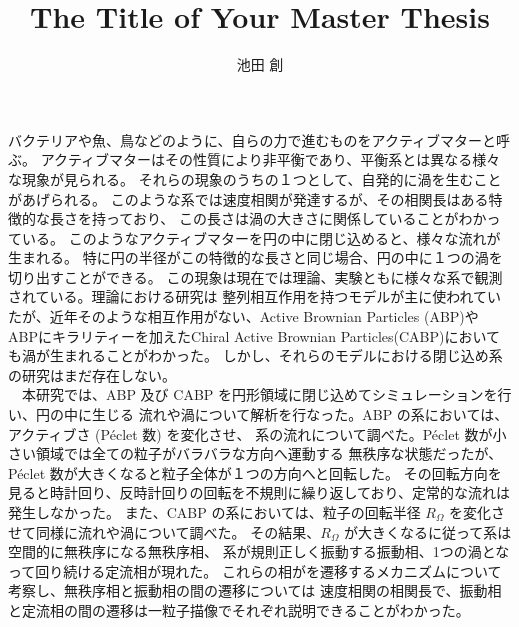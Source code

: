 \documentclass[a4paper]{jarticle}
\title{{\Large The Title of Your Master Thesis}}
\author{池田 創}
\date{}
\begin{document}
\maketitle
\thispagestyle{empty}
\normalsize
バクテリアや魚、鳥などのように、自らの力で進むものをアクティブマターと呼ぶ。
アクティブマターはその性質により非平衡であり、平衡系とは異なる様々な現象が見られる。
それらの現象のうちの１つとして、自発的に渦を生むことがあげられる。
このような系では速度相関が発達するが、その相関長はある特徴的な長さを持っており、
この長さは渦の大きさに関係していることがわかっている。
このようなアクティブマターを円の中に閉じ込めると、様々な流れが生まれる。
特に円の半径がこの特徴的な長さと同じ場合、円の中に１つの渦を切り出すことができる。
この現象は現在では理論、実験ともに様々な系で観測されている。理論における研究は
整列相互作用を持つモデルが主に使われていたが、近年そのような相互作用がない、Active Brownian Particles (ABP)や
ABPにキラリティーを加えたChiral Active Brownian Particles(CABP)においても渦が生まれることがわかった\cite{szamelLongrangedVelocityCorrelations2021,szamelLongrangedVelocityCorrelations2021,kurodaAnomalousFluctuationsHomogeneous2023,kurodaLongrangeTranslationalOrder2024}。
しかし、それらのモデルにおける閉じ込め系の研究はまだ存在しない。\\
　本研究では、ABP 及び CABP を円形領域に閉じ込めてシミュレーションを行い、円の中に生じる
流れや渦について解析を行なった。ABP の系においては、アクティブさ (Péclet 数) を変化させ、
系の流れについて調べた。Péclet 数が小さい領域では全ての粒子がバラバラな方向へ運動する
無秩序な状態だったが、Péclet 数が大きくなると粒子全体が１つの方向へと回転した。
その回転方向を見ると時計回り、反時計回りの回転を不規則に繰り返しており、定常的な流れは発生しなかった。
また、CABP の系においては、粒子の回転半径 $R_\Omega$ を変化させて同様に流れや渦について調べた。
その結果、$R_\Omega$ が大きくなるに従って系は空間的に無秩序になる無秩序相、
系が規則正しく振動する振動相、1つの渦となって回り続ける定流相が現れた。
これらの相がを遷移するメカニズムについて考察し、無秩序相と振動相の間の遷移については
速度相関の相関長で、振動相と定流相の間の遷移は一粒子描像でそれぞれ説明できることがわかった。






\normalsize{
\printbibliography[title=参考文献]
}
\end{document}
